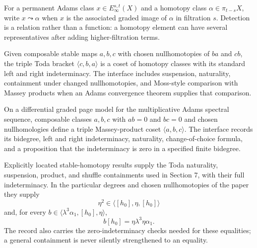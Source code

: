 \begin{definition}
  \label{def:adams-detection}
  \notready
  For a permanent Adams class $x\in E_\infty^{s,t}(X)$ and a homotopy class
  $\alpha\in\pi_{t-s}X$, write $x\leadsto\alpha$ when $x$ is the associated
  graded image of $\alpha$ in filtration $s$.  Detection is a relation rather
  than a function: a homotopy element can have several representatives after
  adding higher-filtration terms.
\end{definition}

\begin{definition}
  \label{def:toda-bracket}
  \notready
  Given composable stable maps $a,b,c$ with chosen nullhomotopies of $ba$ and
  $cb$, the triple Toda bracket $\langle c,b,a\rangle$ is a coset of homotopy
  classes with its standard left and right indeterminacy.  The interface
  includes suspension, naturality, containment under changed nullhomotopies,
  and Moss-style comparison with Massey products when an Adams convergence
  theorem supplies that comparison.
\end{definition}

\begin{definition}
  \label{def:massey-product}
  \notready
  On a differential graded page model for the multiplicative Adams spectral
  sequence, composable classes $a,b,c$ with $ab=0$ and $bc=0$ and chosen
  nullhomologies define a triple Massey-product coset
  $\langle a,b,c\rangle$.  The interface records its bidegree, left and right
  indeterminacy, naturality, change-of-choice formula, and a proposition that
  the indeterminacy is zero in a specified finite bidegree.
\end{definition}

\begin{theorem}
  \label{thm:toda-product-identities}
  \notready
  Explicitly located stable-homotopy results supply the Toda naturality,
  suspension, product, and shuffle containments used in Section 7, with their
  full indeterminacy.  In the particular degrees and chosen nullhomotopies of
  the paper they supply
  \[
    \eta^2\in\langle[h_0],\eta,[h_0]\rangle
  \]
  and, for every
  $b\in\langle\lambda^3\alpha_1,[h_0],\eta\rangle$,
  \[
    b[h_0]=\eta\lambda^3\eta\alpha_1.
  \]
  The record also carries the zero-indeterminacy checks needed for these
  equalities; a general containment is never silently strengthened to an
  equality.
\end{theorem}

